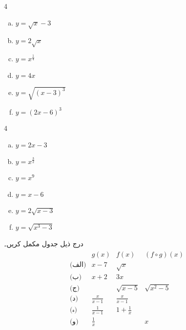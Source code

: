 \begin{multicols}{4}
\begin{enumerate}[a.]
\item
$y=\sqrt{x}-3$
\item
$y=2\sqrt{x}$
\item
$y=x^{\tfrac{1}{4}}$
\item
$y=4x$
\item
$y=\sqrt{(x-3)^3}$
\item
$y=(2x-6)^3$
\end{enumerate}
\end{multicols}
\begin{multicols}{4}
\begin{enumerate}[a.]
\item
$y=2x-3$
\item
$y=x^{\tfrac{3}{2}}$
\item
$y=x^9$
\item
$y=x-6$
\item
$y=2\sqrt{x-3}$
\item
$y=\sqrt{x^3-3}$
\end{enumerate}
\end{multicols}
درج ذیل جدول مکمل کریں۔
\begin{align*}
\begin{array}{cccc}
&g(x)&f(x)&(f\circ g)(x)\\
\hline
\text{(الف)} & x-7& \sqrt{x}&\\
\text{(ب)}&x+2&3x&\\
\text{(ج)} & &\sqrt{x-5}&\sqrt{x^2-5}\\
\text{(د)} &\frac{x}{x-1}&\frac{x}{x-1}&\\
\text{(ہ)}& \frac{1}{x-1}&1+\frac{1}{x}&\\
\text{(و)} &\frac{1}{x}&&x
\end{array}
\end{align*}
